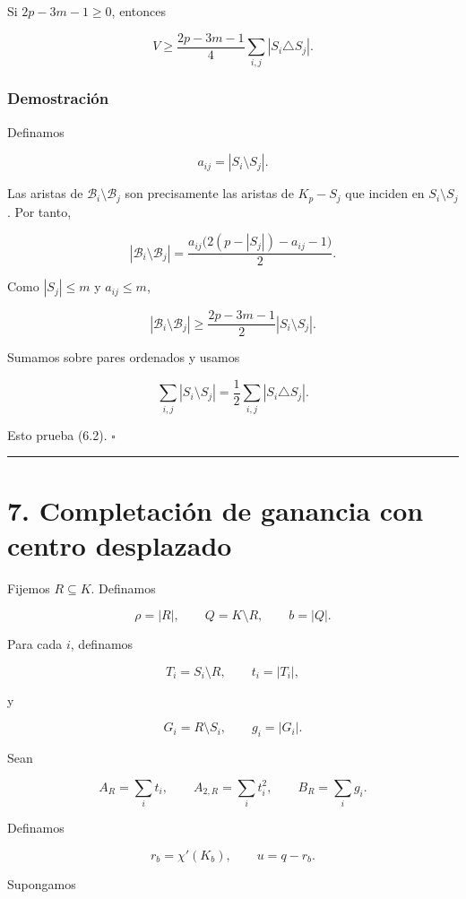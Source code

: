 \documentclass[
  11pt,
]{article}
\begin{document}
Si \(2p-3m-1\ge0\), entonces

\[
\boxed{
V
\ge
\frac{2p-3m-1}{4}
\sum_{i,j}|S_i\triangle S_j|.
}
\tag{6.2}
\]

\subsubsection{Demostración}\label{demostraciuxf3n-5}

Definamos

\[
a_{ij}=|S_i\setminus S_j|.
\]

Las aristas de \(\mathcal B_i\setminus\mathcal B_j\) son precisamente
las aristas de \(K_p-S_j\) que inciden en \(S_i\setminus S_j\). Por
tanto,

\[
|\mathcal B_i\setminus\mathcal B_j|
=
\frac{a_{ij}\bigl(2(p-|S_j|)-a_{ij}-1\bigr)}2.
\]

Como \(|S_j|\le m\) y \(a_{ij}\le m\),

\[
|\mathcal B_i\setminus\mathcal B_j|
\ge
\frac{2p-3m-1}{2}|S_i\setminus S_j|.
\]

Sumamos sobre pares ordenados y usamos

\[
\sum_{i,j}|S_i\setminus S_j|
=
\frac12\sum_{i,j}|S_i\triangle S_j|.
\]

Esto prueba (6.2). \(\square\)

\begin{center}\rule{0.5\linewidth}{0.5pt}\end{center}

\section{7. Completación de ganancia con centro
desplazado}\label{completaciuxf3n-de-ganancia-con-centro-desplazado}

Fijemos \(R\subseteq K\). Definamos

\[
\rho=|R|,
\qquad
Q=K\setminus R,
\qquad
b=|Q|.
\]

Para cada \(i\), definamos

\[
T_i=S_i\setminus R,
\qquad
t_i=|T_i|,
\]

y

\[
G_i=R\setminus S_i,
\qquad
g_i=|G_i|.
\]

Sean

\[
A_R=\sum_i t_i,
\qquad
A_{2,R}=\sum_i t_i^2,
\qquad
B_R=\sum_i g_i.
\]

Definamos

\[
r_b=\chi'(K_b),
\qquad
u=q-r_b.
\]

Supongamos
\end{document}
